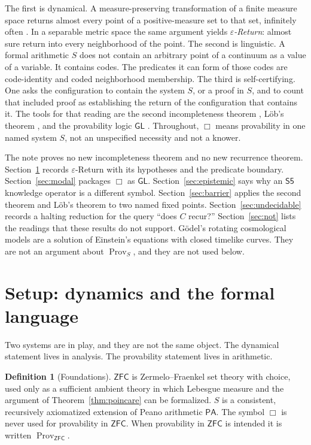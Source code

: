 \documentclass[11pt]{article}
\DeclareMathOperator{\Prov}{Prov}
\newcommand{\PA}{\mathsf{PA}}
\newcommand{\ZFC}{\mathsf{ZFC}}
\newcommand{\GL}{\mathsf{GL}}
\theoremstyle{definition}
\newtheorem{definition}[theorem]{Definition}
\theoremstyle{remark}
\begin{document}
The first is dynamical.
A measure-preserving transformation of a finite measure space returns almost every point of a positive-measure set to that set, infinitely often \citep{poincare1890,walters1982}.
In a separable metric space the same argument yields \emph{\(\varepsilon\)-Return}: almost sure return into every neighborhood of the point.
The second is linguistic.
A formal arithmetic \(S\) does not contain an arbitrary point of a continuum as a value of a variable.
It contains codes.
The predicates it can form of those codes are code-identity and coded neighborhood membership.
The third is self-certifying.
One asks the configuration to contain the system \(S\), or a proof in \(S\), and to count that included proof as establishing the return of the configuration that contains it.
The tools for that reading are the second incompleteness theorem \citep{godel1931}, L\"ob's theorem \citep{lob1955}, and the provability logic \(\GL\) \citep{solovay1976,boolos1993}.
Throughout, \(\Box\) means provability in one named system \(S\), not an unspecified necessity and not a knower.

The note proves no new incompleteness theorem and no new recurrence theorem.
Section~\ref{sec:setup} records \(\varepsilon\)-Return with its hypotheses and the predicate boundary.
Section~\ref{sec:modal} packages \(\Box\) as \(\GL\).
Section~\ref{sec:epistemic} says why an \(\mathsf{S5}\) knowledge operator is a different symbol.
Section~\ref{sec:barrier} applies the second theorem and L\"ob's theorem to two named fixed points.
Section~\ref{sec:undecidable} records a halting reduction for the query ``does \(C\) recur?''
Section~\ref{sec:not} lists the readings that these results do not support.
G\"odel's rotating cosmological models \citep{godel1949} are a solution of Einstein's equations with closed timelike curves.
They are not an argument about \(\Prov_S\), and they are not used below.

\section{Setup: dynamics and the formal language}
\label{sec:setup}

Two systems are in play, and they are not the same object.
The dynamical statement lives in analysis.
The provability statement lives in arithmetic.

\begin{definition}[Foundations]
\label{def:systems}
\(\ZFC\) is Zermelo--Fraenkel set theory with choice, used only as a sufficient ambient theory in which Lebesgue measure and the argument of Theorem~\ref{thm:poincare} can be formalized.
\(S\) is a consistent, recursively axiomatized extension of Peano arithmetic \(\PA\).
The symbol \(\Box\) is never used for provability in \(\ZFC\).
When provability in \(\ZFC\) is intended it is written \(\Prov_{\ZFC}\).
\end{definition}
\end{document}
